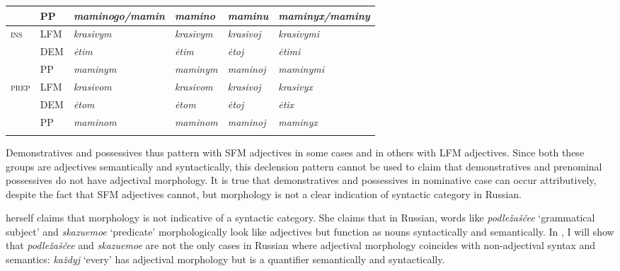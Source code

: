 \documentclass[output=paper,
colorlinks,
citecolor=brown,
newtxmath
]{langscibook}
\begin{document}
\begin{table}
\begin{tabular}{>{\scshape}llllll}
  &               PP          &       \textit{maminogo/mamin}     & \textit{mamino}    & \textit{maminu}    & \textit{maminyx/maminy}\\
  \midrule 
  ins&   LFM         &       \textit{krasivym}           & \textit{krasivym}  & \textit{krasivoj}  & \textit{krasivymi}\\
  &               DEM         &       \textit{ėtim}               & \textit{ėtim}      & \textit{ėtoj}      & \textit{ėtimi}\\
  &               PP          &       \textit{maminym}            & \textit{maminym}   & \textit{maminoj}   & \textit{maminymi}\\
  \midrule
  prep&  LFM         &       \textit{krasivom}           & \textit{krasivom}  & \textit{krasivoj}  & \textit{krasivyx}\\
  &               DEM         &       \textit{ėtom}               & \textit{ėtom}      & \textit{ėtoj}      & \textit{ėtix}\\
  &               PP          &       \textit{maminom}            & \textit{maminom}   & \textit{maminoj}   & \textit{maminyx}\\
  \lspbottomrule
\end{tabular}
\end{table}

Demonstratives and possessives thus pattern with SFM adjectives in some cases and in others with LFM adjectives. Since both these groups are adjectives semantically and syntactically, this declension pattern cannot be used to claim that demonstratives and prenominal possessives do not have adjectival morphology. It is true that demonstratives and possessives in nominative case can occur attributively, despite the fact that SFM adjectives cannot, but morphology is not a clear indication of syntactic category in Russian. 

\citet{Pereltsvaig2007} herself claims that morphology is not indicative of a syntactic category. She claims that in Russian, words like \textit{podležaščee} `grammatical subject' and \textit{skazuemoe} `predicate' morphologically look like adjectives but function as nouns syntactically and semantically. 
In , I will show that \textit{podležaščee} and \textit{skazuemoe} are not the only cases in Russian where adjectival morphology coincides with non-adjectival syntax and semantics:  \textit{každyj} `every' has adjectival morphology but is a quantifier semantically and syntactically.  

\end{document}
